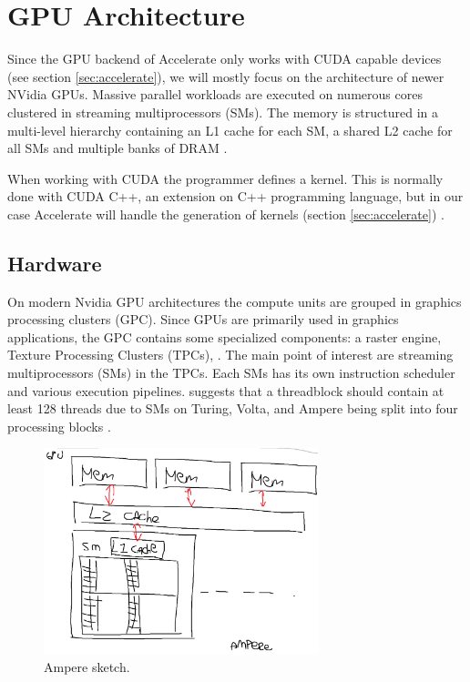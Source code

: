 
\section{GPU Architecture}
Since the GPU backend of Accelerate only works with CUDA capable devices (see section \ref{sec:accelerate}), we will mostly focus on the architecture of newer NVidia GPUs.
Massive parallel workloads are executed on numerous cores clustered in streaming multiprocessors (SMs).
The memory is structured in a multi-level hierarchy containing an L1 cache for each SM, a shared L2 cache for all SMs and multiple banks of DRAM \cite{nvidia2017volta,nvidia2020ampere}.

When working with CUDA the programmer defines a kernel.
This is normally done with CUDA C++, an extension on C++ programming language, but in our case Accelerate will handle the generation of kernels (section \ref{sec:accelerate}) \cite{nvidia2021cudadocs}.

\subsection{Hardware}
On modern Nvidia GPU architectures the compute units are grouped in graphics processing clusters (GPC).
Since GPUs are primarily used in graphics applications, the GPC contains some specialized components: a raster engine, Texture Processing Clusters (TPCs), \TODO{\dots}.
The main point of interest are streaming multiprocessors (SMs) in the TPCs.
Each SMs has its own instruction scheduler and various execution pipelines.
\citeauthor{jia2019dissecting} suggests that a threadblock should contain at least 128 threads due to SMs on Turing, Volta, and Ampere being split into four processing blocks \cite{jia2019dissecting,nvidia2017volta,nvidia2018turing,nvidia2020ampere}.


\begin{figure}[!hb]
    \centering
    \includegraphics[width=8cm]{sketches/ampere_arch.png}
    \caption{
        Ampere sketch.
    }
\end{figure}

